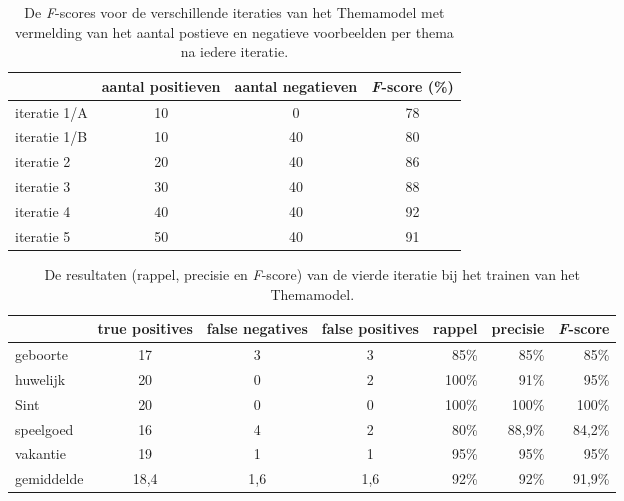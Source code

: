 \begin{table}
    \centering
    \begin{tabular}{l|cc|c}
        \toprule
        & aantal positieven  &  aantal negatieven & \textit{F}-score (\%)\\
        \midrule
        iteratie 1/A & 10 & 0 & 78 \\
        iteratie 1/B & 10 & 40 & 80 \\
        iteratie 2 & 20 & 40 & 86 \\
        iteratie 3 & 30 & 40 & 88 \\
        iteratie 4 & 40 & 40 & 92 \\
        iteratie 5 & 50 & 40 & 91 \\
        \bottomrule
    \end{tabular}
    \caption[De \textit{F}-scores voor de verschillende iteraties van het Themamodel.]{De \textit{F}-scores voor de verschillende iteraties van het Themamodel met vermelding van het aantal postieve en negatieve voorbeelden per thema na iedere iteratie.}
    \label{tab:validatie-themamodel}
\end{table}


\begin{table}
    
    \begin{tabular}{l|ccc|rrr}
        \toprule
        & true positives  & false negatives & false positives & rappel & precisie & \textit{F}-score \\
        \midrule
        geboorte & 17 & 3 & 3 & 85\% & 85\% & 85\% \\
        huwelijk & 20 & 0 & 2 & 100\% & 91\% & 95\% \\
        Sint & 20 & 0 & 0 & 100\% & 100\% & 100\% \\
        speelgoed & 16 & 4 & 2 & 80\% & 88,9\% & 84,2\% \\
        vakantie & 19 & 1 & 1 & 95\% & 95\% & 95\% \\
        \midrule
        gemiddelde & 18,4 & 1,6 & 1,6 & 92\% & 92\% & 91,9\% \\
        \bottomrule
    \end{tabular}
    \caption{De resultaten (rappel, precisie en \textit{F}-score) van de vierde iteratie bij het trainen van het Themamodel.}
    \label{tab:validatie-iteratie4-themamodel}
\end{table}

